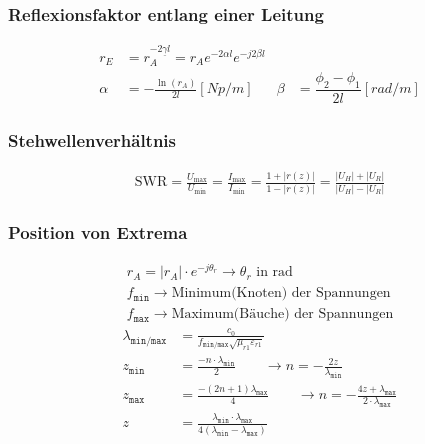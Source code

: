 \subsubsection{Reflexionsfaktor entlang einer Leitung}
\begin{align*}
    r_E    & = r_A  ^{-2\underline{\gamma} l} = r_A  e^{-2\alpha l} e^{-j2\beta l}                                                     \\
    \alpha & = -\frac{\ln(r_A)}{2l} [\si{Np/m}]                                    & \beta & = \dfrac{\phi_2 -\phi_1}{2l} [\si{rad/m}]
\end{align*}

\subsubsection{Stehwellenverhältnis}
\begin{align*}
    \mathrm{SWR} = \frac{U_\text{max}}{U_\text{min}} =
    \frac{I_\text{max}}{I_\text{min}} = \frac{1+|r(z)|}{1-|r(z)|} =
    \frac{|U_H|+|U_R|}{|U_H|-|U_R|}
\end{align*}

\subsubsection{Position von Extrema}
\begin{gather*}
    \boxed{r_A = |r_A|\cdot e^{-j\theta_r}}\rightarrow\theta_r\text{ in rad}\\
    f_\texttt{min}\rightarrow \text{Minimum(Knoten) der Spannungen}\\
    f_\texttt{max}\rightarrow \text{Maximum(Bäuche) der Spannungen}
\end{gather*}
\begin{align*}
    \lambda_\texttt{min/max} & = \frac{c_0}{f_\texttt{min/max}\sqrt{\mu_{r1}\varepsilon_{r1}}}                                                                                                 \\
    z_\texttt{min}           & =\frac{-n\cdot\lambda_\texttt{min}}{2}                                        \qquad\rightarrow n = -\frac{2z}{\lambda_\texttt{min}}                            \\
    z_\texttt{max}           & =\frac{-(2n+1)\lambda_\texttt{max}}{4}                                        \qquad\rightarrow n = -\frac{4z+\lambda_\texttt{max}}{2\cdot\lambda_\texttt{max}} \\
    z                        & = \frac{\lambda_\texttt{min}\cdot\lambda_\texttt{max}}{4(\lambda_\texttt{min}-\lambda_\texttt{max})}
\end{align*}


